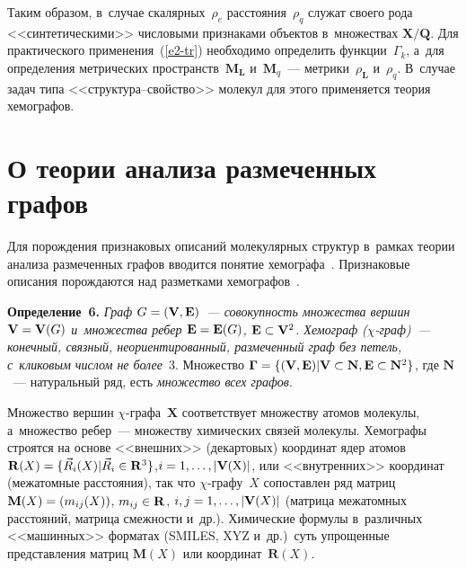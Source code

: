 \begin{multicols}{2}
\smallskip

    Таким образом, в~случае скалярных~$\rho_e$ расстояния~$\rho_q$ служат 
своего рода <<синтетическими>> числовыми признаками объектов 
в~множествах $\mathbf{X}/\mathbf{Q}$. Для практического 
применения~(\ref{e2-tr}) необходимо определить функции~$\Gamma_k$, а~для 
определения метрических пространств~$\mathbf{M}_{\mathbf{L}}$ 
и~$\mathbf{M}_q$~--- метрики~$\rho_{\mathbf{L}}$ и~$\rho_q$. В~случае 
задач типа <<струк\-ту\-ра--свой\-ст\-во>> молекул для этого применяется 
теория хемографов.

\vspace*{-6pt}

\section{О теории анализа размеченных графов}

\vspace*{-2pt}

     Для порождения признаковых описаний молекулярных структур в~рамках 
теории анализа размеченных графов вводится понятие 
хемогр$\acute{\mbox{а}}$фа~\cite{7-tr}. Признаковые описания порождаются 
над разметками хемографов~\cite{8-tr}.
     
     \smallskip
     
     \noindent
\textbf{Определение~6.} \textit{Граф $G\hm= (\mathbf{V}, \mathbf{E})$~--- совокупность 
множества вершин $\mathbf{V}\hm= \mathbf{V}(G)$ и~множества ребер $\mathbf{E}\hm=\mathbf{E}(G)$, 
$\mathbf{E}\hm\subset \mathbf{V}^2$. Хемограф ($\chi$-граф)~--- конечный, связный, 
неориентированный, размеченный граф без петель, с~кликовым числом не 
более}~3. Множество $\boldsymbol{\Gamma}\hm= \{ (\mathbf{V}, \mathbf{E})\vert \mathbf{V} \hm\subset \mathbf{N}, 
\mathbf{E}\hm\subset \mathbf{N}^2\}$, где $\mathbf{N}$~--- натуральный ряд, есть 
\textit{множество всех графов}.

\smallskip

     Множество вершин $\chi$-гра\-фа~$\mathbf{X}$ соответствует\linebreak 
множеству атомов молекулы, а~множество ребер~--- множеству химических 
связей молекулы. Хемографы строятся на основе <<внеш\-них>> (декартовых) 
координат ядер атомов $\mathbf{\mathbf{R}}(X)\hm= \{ \vec{R}_i(X)\vert \vec{R}_i\hm\in 
\mathbf{R}^3\}$,\linebreak $i\hm= 1,\ldots , \vert \mathbf{V}(\mathrm{X})\vert$, или  
<<внут\-рен\-них>> координат (межатомные расстояния), так что $\chi$-гра\-фу~${X}$ 
со\-по\-став\-лен ряд мат\-риц $\mathbf{M}({X})\hm= 
(m_{ij}({X}))$, $m_{ij}\hm\in \mathbf{R}$, $i,j\hm= 1,\ldots , \vert 
\mathbf{V}({X})\vert$ (матрица межатомных расстояний, матрица смежности 
и~др.). Химические формулы в~различных <<машинных>> форматах (SMILES, 
XYZ и~др.)\ суть упрощенные пред\-став\-ле\-ния мат\-риц 
$\mathbf{M}({X})$ или координат~$\mathbf{R}(X)$.
     

\end{multicols}

